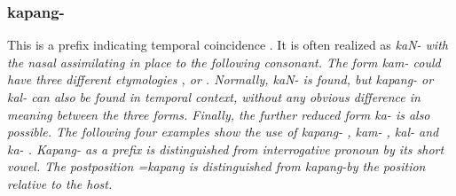 \subsubsection{kapang-}\label{sec:morph:kapang-}
This is a   prefix indicating temporal coincidence \citep[cf.][]{Slomanson2008ismil}. It is often realized as \em kaN- \em with the nasal assimilating in place to the following consonant. The form \em kam- \em could have three different etymologies ,  or . Normally, \em kaN- \em is found, but \em kapang- \em or  \em kal- \em can also be found in temporal context, without any obvious difference in meaning between the three forms. Finally, the further reduced form \em ka- \em is also possible. The following four examples show the use of \em kapang- , kam- , kal-  \em and \em ka- \em {}.  \em Kapang- \em as a prefix is distinguished from interrogative pronoun   by its short vowel. The postposition \em =kapang \em {} is distinguished from \em kapang-\em by the position relative to the host.
 \\

 

